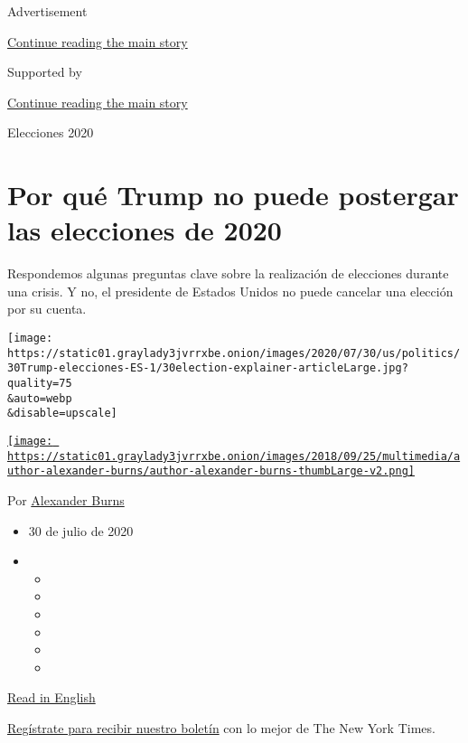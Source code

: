 Advertisement

\protect\hyperlink{after-top}{Continue reading the main story}

Supported by

\protect\hyperlink{after-sponsor}{Continue reading the main story}

Elecciones 2020

\hypertarget{por-quuxe9-trump-no-puede-postergar-las-elecciones-de-2020}{%
\section{Por qué Trump no puede postergar las elecciones de
2020}\label{por-quuxe9-trump-no-puede-postergar-las-elecciones-de-2020}}

Respondemos algunas preguntas clave sobre la realización de elecciones
durante una crisis. Y no, el presidente de Estados Unidos no puede
cancelar una elección por su cuenta.

\texttt{[image: https://static01.graylady3jvrrxbe.onion/images/2020/07/30/us/politics/30Trump-elecciones-ES-1/30election-explainer-articleLarge.jpg?quality=75\\\&auto=webp\\\&disable=upscale]}

\href{https://www.nytimes3xbfgragh.onion/by/alexander-burns}{\texttt{[image: https://static01.graylady3jvrrxbe.onion/images/2018/09/25/multimedia/author-alexander-burns/author-alexander-burns-thumbLarge-v2.png]}}

Por
\href{https://www.nytimes3xbfgragh.onion/by/alexander-burns}{Alexander
Burns}

\begin{itemize}
\item
  30 de julio de 2020
\item
  \begin{itemize}
  \item
  \item
  \item
  \item
  \item
  \item
  \end{itemize}
\end{itemize}

\href{https://www.nytimes3xbfgragh.onion/2020/07/30/us/politics/trump-postpone-election.html}{Read
in English}

\href{https://www.nytimes3xbfgragh.onion/newsletters/el-times}{Regístrate
para recibir nuestro boletín} con lo mejor de The New York Times.

